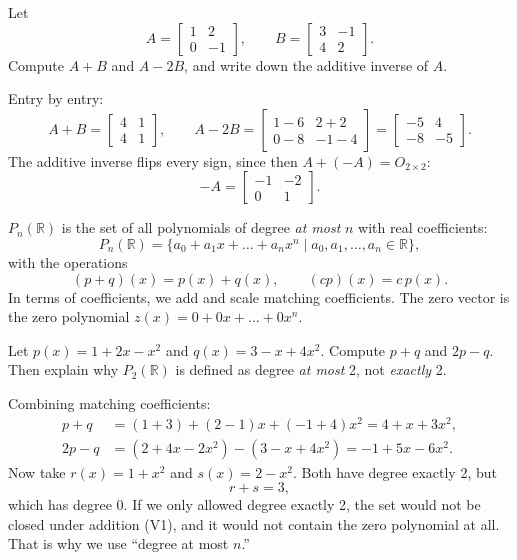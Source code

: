\begin{example}
Let
\[
A = \begin{bmatrix} 1 & 2 \\ 0 & -1 \end{bmatrix}, \qquad B = \begin{bmatrix} 3 & -1 \\ 4 & 2 \end{bmatrix}.
\]
Compute $A + B$ and $A - 2B$, and write down the additive inverse of $A$.

\begin{solution}
Entry by entry:
\[
A + B = \begin{bmatrix} 4 & 1 \\ 4 & 1 \end{bmatrix},
\qquad
A - 2B = \begin{bmatrix} 1 - 6 & 2 + 2 \\ 0 - 8 & -1 - 4 \end{bmatrix} = \begin{bmatrix} -5 & 4 \\ -8 & -5 \end{bmatrix}.
\]
The additive inverse flips every sign, since then $A + (-A) = O_{2 \times 2}$:
\[
-A = \begin{bmatrix} -1 & -2 \\ 0 & 1 \end{bmatrix}.
\]
\end{solution}
\end{example}

\begin{definition}
$P_n(\mathbb{R})$ is the set of all polynomials of degree \emph{at most} $n$ with real coefficients:
\[
P_n(\mathbb{R}) = \{ a_0 + a_1x + \dots + a_nx^n \mid a_0, a_1, \dots, a_n \in \mathbb{R} \},
\]
with the operations
\[
(p + q)(x) = p(x) + q(x), \qquad (cp)(x) = c\,p(x).
\]
In terms of coefficients, we add and scale matching coefficients. The zero vector is the zero polynomial $z(x) = 0 + 0x + \dots + 0x^n$.
\end{definition}

\begin{example}
Let $p(x) = 1 + 2x - x^2$ and $q(x) = 3 - x + 4x^2$. Compute $p + q$ and $2p - q$. Then explain why $P_2(\mathbb{R})$ is defined as degree \emph{at most} 2, not \emph{exactly} 2.

\begin{solution}
Combining matching coefficients:
\begin{align*}
p + q  &= (1 + 3) + (2 - 1)x + (-1 + 4)x^2 = 4 + x + 3x^2, \\
2p - q &= (2 + 4x - 2x^2) - (3 - x + 4x^2) = -1 + 5x - 6x^2.
\end{align*}
Now take $r(x) = 1 + x^2$ and $s(x) = 2 - x^2$. Both have degree exactly 2, but
\[
r + s = 3,
\]
which has degree 0. If we only allowed degree exactly 2, the set would not be closed under addition (V1), and it would not contain the zero polynomial at all. That is why we use ``degree at most $n$.''
\end{solution}
\end{example}

